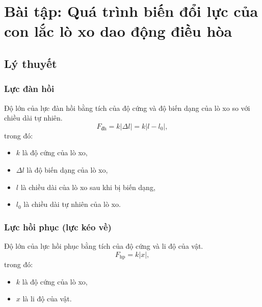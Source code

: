 
\chapter[Bài tập: Quá trình biến đổi lực của con lắc lò xo dao động điều hòa]{Bài tập: Quá trình biến đổi lực của con lắc lò xo dao động điều hòa}
\section{Lý thuyết}
\subsection{Lực đàn hồi}
Độ lớn của lực đàn hồi bằng tích của độ cứng và độ biến dạng của lò xo so với chiều dài tự nhiên.
\begin{equation*} 
	F_\text{đh}=k\left| \Delta l\right|=k\left| l-l_0\right|, 
\end{equation*}
trong đó:
\begin{itemize}
	\item  $k$ là độ cứng của lò xo,
	\item  $\Delta l$ là độ biến dạng của lò xo,
	\item $l$ là chiều dài của lò xo sau khi bị biến dạng,
	\item $l_0$ là chiều dài tự nhiên của lò xo.
\end{itemize}
\subsection{Lực hồi phục (lực kéo về)}
Độ lớn của lực hồi phục bằng tích của độ cứng và li độ của vật.
\begin{equation*} 
	F_\text{hp}=k\left|  x \right|, 
\end{equation*}
trong  đó:
\begin{itemize}
	\item  $k$ là độ cứng của lò xo,
	\item  $x$ là li độ của vật.
\end{itemize}
